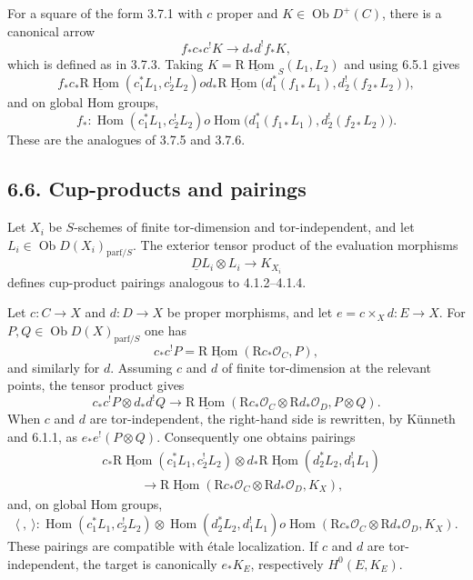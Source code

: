 \documentclass[12pt]{article}
\newcommand{\Hom}{\operatorname{Hom}}
\newcommand{\ob}{\operatorname{Ob}}
\newcommand{\R}{\mathrm R}
\newcommand{\cO}{\mathcal O}
\begin{document}
For a square of the form 3.7.1 with $c$ proper and $K\in\ob D^+(C)$, there is a canonical arrow
\begin{equation}
   f_*c_*c^!K\to d_*d^!f_*K,
   \tag{6.5.3}
\end{equation}
which is defined as in 3.7.3. Taking $K=\underline{\R\Hom}_S(L_1,L_2)$ and using 6.5.1 gives
\begin{equation}
   f_*c_*\underline{\R\Hom}(c_1^*L_1,c_2^!L_2)	o
   d_*\underline{\R\Hom}\bigl(d_1^*(f_{1*}L_1),d_2^!(f_{2*}L_2)\bigr),
   \tag{6.5.4}
\end{equation}
and on global Hom groups,
\begin{equation}
   f_*:\Hom(c_1^*L_1,c_2^!L_2)	o
   \Hom\bigl(d_1^*(f_{1*}L_1),d_2^!(f_{2*}L_2)\bigr).
   \tag{6.5.5}
\end{equation}
These are the analogues of 3.7.5 and 3.7.6.

\subsection*{6.6. Cup-products and pairings}
Let $X_i$ be $S$-schemes of finite tor-dimension and tor-independent, and let $L_i\in\ob D(X_i)_{\mathrm{parf}/S}$. The exterior tensor product of the evaluation morphisms
\[
   \underline{D}L_i\otimes L_i\to K_{X_i}
\]
defines cup-product pairings analogous to 4.1.2--4.1.4.

Let $c:C\to X$ and $d:D\to X$ be proper morphisms, and let $e=c\times_X d:E\to X$. For $P,Q\in\ob D(X)_{\mathrm{parf}/S}$ one has
\[
   c_*c^!P=\underline{\R\Hom}(\R c_*\cO_C,P),
\]
and similarly for $d$. Assuming $c$ and $d$ of finite tor-dimension at the relevant points, the tensor product gives
\begin{equation}
   c_*c^!P\otimes d_*d^!Q
   \to
   \underline{\R\Hom}(\R c_*\cO_C\otimes \R d_*\cO_D,P\otimes Q).
   \tag{6.6.1}
\end{equation}
When $c$ and $d$ are tor-independent, the right-hand side is rewritten, by Künneth and 6.1.1, as $e_*e^!(P\otimes Q)$. Consequently one obtains pairings
\begin{equation}
\begin{split}
 &c_*\underline{\R\Hom}(c_1^*L_1,c_2^!L_2)
 \otimes d_*\underline{\R\Hom}(d_2^*L_2,d_1^!L_1)\\
 &\hspace{3em}\longrightarrow
 \underline{\R\Hom}(\R c_*\cO_C\otimes \R d_*\cO_D,K_X),
\end{split}
\tag{6.6.2}
\end{equation}
and, on global Hom groups,
\begin{equation}
   \langle\ ,\ \rangle:
   \Hom(c_1^*L_1,c_2^!L_2)\otimes
   \Hom(d_2^*L_2,d_1^!L_1)	o
   \Hom(\R c_*\cO_C\otimes \R d_*\cO_D,K_X).
   \tag{6.6.3}
\end{equation}
These pairings are compatible with étale localization. If $c$ and $d$ are tor-independent, the target is canonically $e_*K_E$, respectively $H^0(E,K_E)$.
\end{document}
